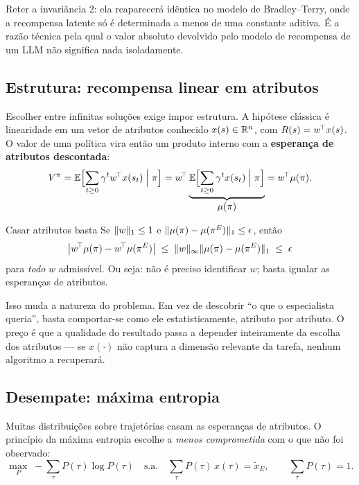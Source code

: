 \documentclass[11pt, a4paper]{article}
\newcommand{\polE}{\pol^{E}}
\newcommand{\traj}{\tau}
\begin{document}
\begin{ideiabox}
Reter a invariância 2: ela reaparecerá idêntica no modelo de Bradley--Terry, onde
a recompensa latente só é determinada a menos de uma constante aditiva. É a razão
técnica pela qual o valor absoluto devolvido pelo modelo de recompensa de um LLM
não significa nada isoladamente.
\end{ideiabox}

\subsection{Estrutura: recompensa linear em atributos}

Escolher entre infinitas soluções exige impor estrutura. A hipótese clássica é
linearidade em um vetor de atributos conhecido $x(s)\in\mathbb{R}^{n}$, com
$R(s) = w^{\!\top}x(s)$. O valor de uma política vira então um produto
interno com a \textbf{esperança de atributos descontada}:
\[
  V^{\pi} = \mathbb{E}\Bigl[\sum_{t\ge0}\gamma^{t} w^{\!\top}x(s_t)\Bigm|\pi\Bigr]
       = w^{\!\top}\underbrace{\mathbb{E}\Bigl[\sum_{t\ge0}\gamma^{t}x(s_t)\Bigm|\pi\Bigr]}_{\textstyle \mu(\pi)}
       = w^{\!\top}\mu(\pi).
\]

\begin{teobox}{Casar atributos basta}
Se $\lVert w\rVert_1 \le 1$ e $\norm{\mu(\pol)-\mu(\polE)}_1 \le \epsilon$, então
\[
  \bigl\lvert w^{\!\top}\mu(\pol) - w^{\!\top}\mu(\polE)\bigr\rvert
  \;\le\; \norm{w}_{\infty}\norm{\mu(\pol)-\mu(\polE)}_{1} \;\le\; \epsilon
\]
para \emph{todo} $w$ admissível. Ou seja: não é preciso identificar $w$; basta
igualar as esperanças de atributos.
\end{teobox}

Isso muda a natureza do problema. Em vez de descobrir ``o que o especialista
queria'', basta comportar-se como ele estatisticamente, atributo por atributo.
O preço é que a qualidade do resultado passa a depender inteiramente da escolha
dos atributos --- se $x(\cdot)$ não captura a dimensão relevante da tarefa,
nenhum algoritmo a recuperará.

\subsection{Desempate: máxima entropia}

Muitas distribuições sobre trajetórias casam as esperanças de atributos. O
princípio da máxima entropia escolhe a \emph{menos comprometida} com o que não
foi observado:
\[
  \max_{P}\; -\sum_{\traj}P(\traj)\log P(\traj)
  \quad\text{s.a.}\quad
  \sum_{\traj}P(\traj)\,x(\traj) = \tilde{x}_{E},
  \qquad \sum_{\traj}P(\traj)=1 .
\]
\end{document}
